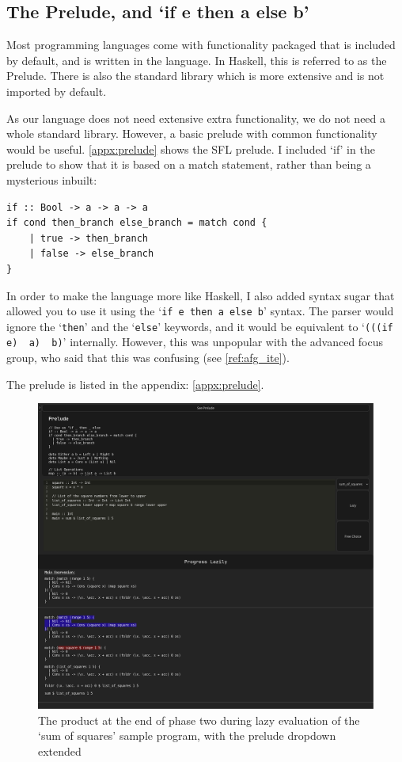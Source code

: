 \subsection{The Prelude, and `if e then a else b'}
Most programming languages come with functionality packaged that is included by default, and is written in the language. In Haskell, this is referred to as the Prelude. There is also the standard library which is more extensive and is not imported by default. 

As our language does not need extensive extra functionality, we do not need a whole standard library. However, a basic prelude with common functionality would be useful. \ref{appx:prelude} shows the SFL prelude. I included `if' in the prelude to show that it is based on a match statement, rather than being a mysterious inbuilt: 

\begin{lstlisting}[language=SFL]
if :: Bool -> a -> a -> a
if cond then_branch else_branch = match cond {
    | true -> then_branch
    | false -> else_branch
}    
\end{lstlisting}

In order to make the language more like Haskell, I also added syntax sugar that allowed you to use it using the `\lstinline[language=SFL_ite]|if e then a else b|' syntax. The parser would ignore the `\lstinline[language=SFL_ite]|then|' and the `\lstinline[language=SFL_ite]|else|' keywords, and it would be equivalent to `\lstinline[language=SFL_ite]|(((if e)  a)  b)|' internally. However, this was unpopular with the advanced focus group, who said that this was confusing (see \ref{ref:afg_ite}). 

The prelude is listed in the appendix: \ref{appx:prelude}.

\begin{figure}[h]
    \centering
    \includegraphics[width=1\linewidth]{images/phase-2-end2.png} 
    \captionsetup{justification=centering}
    \caption{The product at the end of phase two during lazy evaluation of the `sum of squares' sample program, with the prelude dropdown extended}
    \label{fig:screenshot_c2_end}
\end{figure}


